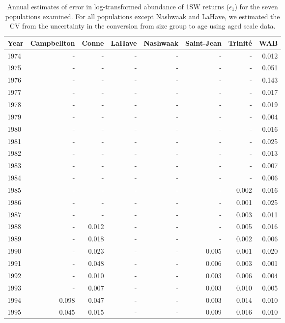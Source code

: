 \begingroup\footnotesize
\begin{longtable}{lrrrrrrr}
\caption{Annual estimates of error in log-transformed abundance of 1SW returns 
                    ($\epsilon_{1}$) for the seven populations
                    examined. For all populations except Nashwaak and LaHave, we estimated the CV 
                    from the uncertainty in the conversion from size group to age using aged scale data.} \\ 
  \hline
Year & Campbellton & Conne & LaHave & Nashwaak & Saint-Jean & Trinité & WAB \\ 
  \hline
1974 & - & - & - & - & - & - & 0.012 \\ 
  1975 & - & - & - & - & - & - & 0.051 \\ 
  1976 & - & - & - & - & - & - & 0.143 \\ 
  1977 & - & - & - & - & - & - & 0.017 \\ 
  1978 & - & - & - & - & - & - & 0.019 \\ 
  1979 & - & - & - & - & - & - & 0.004 \\ 
  1980 & - & - & - & - & - & - & 0.016 \\ 
  1981 & - & - & - & - & - & - & 0.025 \\ 
  1982 & - & - & - & - & - & - & 0.013 \\ 
  1983 & - & - & - & - & - & - & 0.007 \\ 
  1984 & - & - & - & - & - & - & 0.006 \\ 
  1985 & - & - & - & - & - & 0.002 & 0.016 \\ 
  1986 & - & - & - & - & - & 0.001 & 0.025 \\ 
  1987 & - & - & - & - & - & 0.003 & 0.011 \\ 
  1988 & - & 0.012 & - & - & - & 0.005 & 0.016 \\ 
  1989 & - & 0.018 & - & - & - & 0.002 & 0.006 \\ 
  1990 & - & 0.023 & - & - & 0.005 & 0.001 & 0.020 \\ 
  1991 & - & 0.048 & - & - & 0.006 & 0.003 & 0.001 \\ 
  1992 & - & 0.010 & - & - & 0.003 & 0.006 & 0.004 \\ 
  1993 & - & 0.007 & - & - & 0.003 & 0.010 & 0.005 \\ 
  1994 & 0.098 & 0.047 & - & - & 0.003 & 0.014 & 0.010 \\ 
  1995 & 0.045 & 0.015 & - & - & 0.009 & 0.016 & 0.010 \\ 

\end{longtable}
